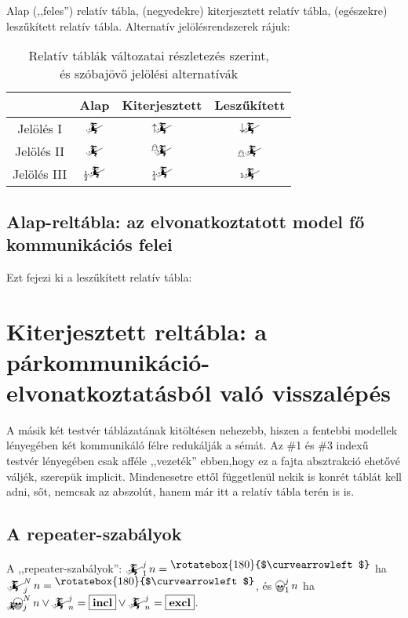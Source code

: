 \documentclass{article}
\newcommand{\nothing}{\text{\raisebox{0.4em}{\rotatebox{180}{$\curvearrowleft$}}}}%
\newcommand{\just}[1]{\boxed{#1}}%
\newcommand{\incl}{\mathbf{incl}}
\newcommand{\excl}{\mathbf{excl}}
\newcommand{\mainfun}[3]{\mathwitch_{#1}^{#2}#3}
\newcommand{\nomainfun}[3]{\bigskull_{#1}^{#2}#3}
\newcommand{\currymainfun}[1]{\mathwitch_{#1}}
\newcommand{\mainfunA}[3]{\mathwitch_{#2}^{#1}#3}
\newcommand{\nomainfunA}[3]{{}_{\mathwitch}\!\!\!\!\bigskull^{#1}_{#2}#3}
\begin{document}
	Alap (,,feles'') relatív tábla, (negyedekre) kiterjesztett relatív tábla, (egészekre) leszűkített relatív tábla. Alternatív jelölésrendszerek rájuk:
	\begin{table}[H]
		\caption*{Relatív táblák változatai részletezés szerint,\\és szóbajövő jelölési alternatívák}
		\centering
		\begin{tabular}{c|ccc}
			             &  Alap                             &  Kiterjesztett                     &  Leszűkített\\\hline\hline
			Jelölés I    &  $\currymainfun{}$                &  $\uparrow\!\!\!\currymainfun{}$       &  $\downarrow\!\!\!\currymainfun{}$\\\hline
			Jelölés II   &  $\currymainfun{}$                &  ${}^{\mathghost}\!\!\!\currymainfun{}$  &  ${}_{\mathghost}\!\currymainfun{}$\\\hline
			Jelölés III  &  ${}_{\frac12}\!\!\currymainfun{}$  &  ${}_{\frac14}\!\!\currymainfun{}$   &  ${}_1\!\!\currymainfun{}$
		\end{tabular}
	\end{table}

	\subsection{Alap-reltábla: az elvonatkoztatott model fő kommunikációs felei}

	Ezt fejezi ki a leszűkített relatív tábla:


	\section{Kiterjesztett reltábla: a párkommunikáció-elvonatkoztatásból való visszalépés}

	A másik két testvér táblázatának kitöltésen nehezebb, hiszen a fentebbi modellek lényegében két kommunikáló félre redukálják a sémát.
	Az \#1 és \#3 indexű testvér lényegében csak afféle ,,vezeték'' ebben,hogy ez a fajta absztrakció ehetővé váljék, szerepük implicit.
	Mindenesetre ettől függetlenül nekik is konrét táblát kell adni, sőt, nemcsak az abszolút, hanem már itt a relatív tábla terén is is.

	\subsection{A repeater-szabályok}

	A ,,repeater-szabályok'': $\mainfun1jn = \nothing$ ha $\mainfunA Njn = \nothing$, és $\nomainfun1jn$ ha $\nomainfunA Njn \lor \mainfunA jn = \just\incl \lor \mainfunA jn = \just\excl$.
\end{document}
